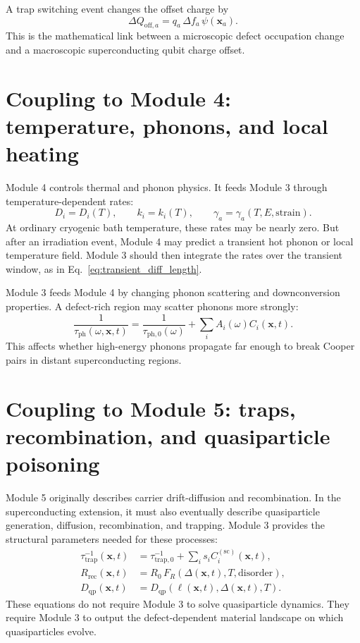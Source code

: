 \documentclass[11pt]{article}
\newcommand{\x}{\mathbf{x}}
\begin{document}
A trap switching event changes the offset charge by
\begin{equation}
\Delta Q_{\mathrm{off},a}=q_a\,\Delta f_a\,\psi(\x_a).
\label{eq:qoff_jump}
\end{equation}
This is the mathematical link between a microscopic defect occupation change and a macroscopic superconducting qubit charge offset.

\section{Coupling to Module 4: temperature, phonons, and local heating}

Module 4 controls thermal and phonon physics. It feeds Module 3 through temperature-dependent rates:
\begin{equation}
D_i=D_i(T),\qquad k_i=k_i(T),\qquad \gamma_a=\gamma_a(T,E,\mathrm{strain}).
\label{eq:m4_to_m3_rates}
\end{equation}
At ordinary cryogenic bath temperature, these rates may be nearly zero. But after an irradiation event, Module 4 may predict a transient hot phonon or local temperature field. Module 3 should then integrate the rates over the transient window, as in Eq.~\eqref{eq:transient_diff_length}.

Module 3 feeds Module 4 by changing phonon scattering and downconversion properties. A defect-rich region may scatter phonons more strongly:
\begin{equation}
\frac{1}{\tau_{\mathrm{ph}}(\omega,\x,t)}
=\frac{1}{\tau_{\mathrm{ph},0}(\omega)}+
\sum_i A_i(\omega) C_i(\x,t).
\label{eq:phonon_scattering_defects}
\end{equation}
This affects whether high-energy phonons propagate far enough to break Cooper pairs in distant superconducting regions.

\section{Coupling to Module 5: traps, recombination, and quasiparticle poisoning}

Module 5 originally describes carrier drift-diffusion and recombination. In the superconducting extension, it must also eventually describe quasiparticle generation, diffusion, recombination, and trapping. Module 3 provides the structural parameters needed for these processes:
\begin{align}
\tau_{\mathrm{trap}}^{-1}(\x,t)&=\tau_{\mathrm{trap},0}^{-1}+\sum_i s_i C_i^{(\mathrm{sc})}(\x,t),
\label{eq:trap_rate_defect}\\
R_{\mathrm{rec}}(\x,t)&=R_0\,F_R(\Delta(\x,t),T,\mathrm{disorder}),
\label{eq:recomb_defect}\\
D_{\mathrm{qp}}(\x,t)&=D_{\mathrm{qp}}(\ell(\x,t),\Delta(\x,t),T).
\label{eq:Dqp_defect}
\end{align}
These equations do not require Module 3 to solve quasiparticle dynamics. They require Module 3 to output the defect-dependent material landscape on which quasiparticles evolve.
\end{document}
